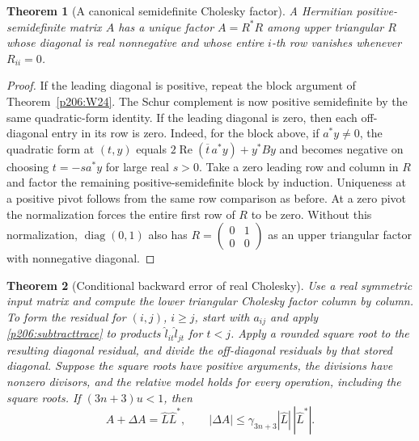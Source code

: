 \documentclass[11pt,oneside,openany]{book}
\theoremstyle{plain}
\newtheorem{theorem}{Theorem}[chapter]
\theoremstyle{definition}
\theoremstyle{remark}
\begin{document}
\begin{theorem}[A canonical semidefinite Cholesky factor]
\label{p206:W25}
A Hermitian positive-semidefinite matrix \(A\) has a unique factor
\(A=R^*R\) among upper triangular \(R\) whose diagonal is real
nonnegative and whose entire \(i\)-th row vanishes whenever
\(R_{ii}=0\).
\end{theorem}

\begin{proof}
If the leading diagonal is positive, repeat the block argument
of Theorem~\ref{p206:W24}. The Schur complement is now
positive semidefinite by the same quadratic-form identity. If
the leading diagonal is zero, then each off-diagonal entry in
its row is zero. Indeed, for the block above, if \(a^*y\ne0\),
the quadratic form at \((t,y)\) equals
\(2\operatorname{Re}(\overline{t}\,a^*y)+y^*By\) and becomes
negative on choosing \(t=-s a^*y\) for large real \(s>0\).
Take a zero leading row and column in \(R\) and factor the
remaining positive-semidefinite block by induction.
Uniqueness at a positive pivot follows from the same row
comparison as before. At a zero pivot the normalization
forces the entire first row of \(R\) to be zero. Without this
normalization, \(\operatorname{diag}(0,1)\) also has
\(R=\left(\begin{smallmatrix}0&1\\0&0\end{smallmatrix}\right)\)
as an upper triangular factor with nonnegative diagonal.
\end{proof}

\begin{theorem}[Conditional backward error of real Cholesky]
\label{p206:W26}
Use a real symmetric input matrix and compute the lower triangular
Cholesky factor column by column. To form the residual for
\((i,j)\), \(i\ge j\), start with \(a_{ij}\) and apply
\eqref{p206:subtracttrace}
to products \(\hat l_{it}\hat l_{jt}\) for \(t<j\).
Apply a rounded square root to the resulting diagonal residual,
and divide the off-diagonal residuals by that stored diagonal.
Suppose the square roots have positive arguments, the divisions
have nonzero divisors, and the relative model holds for every
operation, including the square roots. If \((3n+3)u<1\), then
\[
        A+\Delta A=\hat L\hat L^*,\qquad
        |\Delta A|\le\gamma_{3n+3}|\hat L|\,|\hat L^*|.
\]
\end{theorem}
\end{document}
